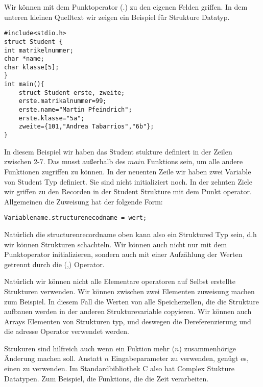 \documentclass{article}[12pt]
\begin{document}
Wir können mit dem Punktoperator (.) zu den eigenen Felden
griffen. In dem unteren kleinen Quelltext wir zeigen ein Beispiel
für Strukture Datatyp.
\begin{lstlisting}
#include<stdio.h>
struct Student { 
int matrikelnummer;
char *name;
char klasse[5];
}
int main(){
    struct Student erste, zweite;
    erste.matrikalnummer=99;
    erste.name="Martin Pfeindrich";
    erste.klasse="5a";
    zweite={101,"Andrea Tabarrios","6b"};
}
\end{lstlisting}
In diesem Beispiel wir haben das Student stukture definiert in der Zeilen zwischen 2-7.
Das musst außerhalb des $main$ Funktions sein, um alle andere Funktionen zugriffen zu können.
In der neuenten Zeile wir haben zwei Variable von Student Typ definiert. Sie sind 
nicht initializiert noch. In der zehnten Ziele wir griffen zu den Recorden in der
Student Strukture mit dem Punkt operator. Allgemeinen die Zuweisung hat der folgende Form:
\begin{lstlisting}
Variablename.structurenecodname = wert;
\end{lstlisting}
Natürlich die structurenrecordname oben kann also ein Struktured Typ sein, d.h wir können
Strukturen schachteln. Wir können auch nicht nur mit dem Punktoperator initializieren, sondern
auch mit einer Aufzählung der Werten getrennt durch die (,) Operator.

Natürlich wir können nicht alle Elementare operatoren auf Selbst
erstellte Strukturen verwenden. Wir können zwischen zwei Elementen zuweisung machen zum Beispiel.
In diesem Fall die Werten von alle Speicherzellen, die die Strukture aufbauen werden in der
anderen Strukturevariable copyieren. Wir können auch Arrays  Elementen von Strukturen typ, 
und deswegen die Dereferenzierung und die adresse Operator verwendet werden.

Strukuren sind hilfreich auch wenn ein Fuktion mehr ($n$) zusammenhörige Änderung machen soll. 
Anstatt $n$ Eingabeparameter zu verwenden, genügt es, einen zu verwenden. Im Standardbibliothek
C also hat Complex Stukture Datatypen. Zum Beispiel, die Funktions, die die Zeit verarbeiten.
\end{document}
